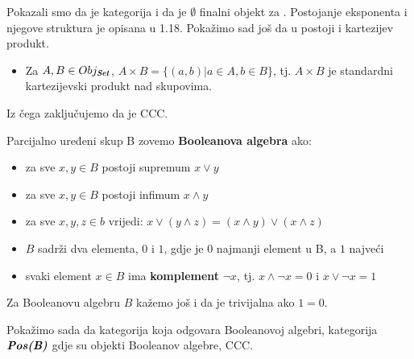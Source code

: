   \begin{example}
    Pokazali smo da je  kategorija i da je $\emptyset$ finalni objekt za . Postojanje eksponenta i njegove struktura je opisana  u 1.18. Pokažimo sad još da u  postoji i kartezijev produkt.
  \begin{itemize}
    \item Za $A, B \in Obj_{\textbf{\emph{Set}}}$, $A \times B = \{ (a, b) | a \in A, b \in B \}$, tj. $A \times B$ je standardni kartezijevski produkt nad skupovima. 
  \end{itemize}

  Iz čega zaključujemo da je  CCC.
  \end{example}
  \begin{definition}
    Parcijalno uređeni skup B zovemo \textbf{Booleanova algebra} ako:
    \begin{itemize}
      \item za sve $x, y \in B$ postoji supremum $x \vee y$
      \item za sve $x, y \in B$ postoji infimum $x \wedge y$
      \item za sve $x, y, z \in b$ vrijedi: $x \vee (y \wedge z) = (x \wedge y) \vee (x \wedge z)$
      \item $B$ sadrži dva elementa, $0$ i $1$, gdje je $0$ najmanji element u B, a $1$ najveći
      \item svaki element $x \in B$ ima \textbf{komplement} $\neg x$, tj. $x \wedge \neg x = 0$ i $x \vee \neg x = 1$
    \end{itemize}
      Za Booleanovu algebru $B$ kažemo još i da je trivijalna ako $1 = 0$.
    \end{definition}
  Pokažimo sada da kategorija koja odgovara Booleanovoj algebri, kategorija $\textbf{\emph{Pos(B)}}$ gdje su objekti Booleanov algebre, CCC. 
